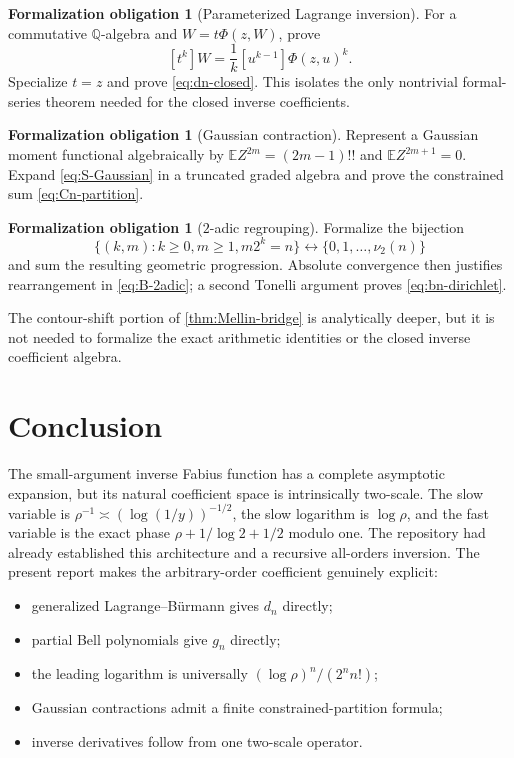 \documentclass[11pt,oneside]{article}
\numberwithin{equation}{section}
\theoremstyle{definition}
\newtheorem{obligation}[theorem]{Formalization obligation}
\theoremstyle{remark}
\newcommand{\Q}{\mathbb Q}
\newcommand{\E}{\mathbb E}
\newcommand{\vTwo}{\nu_2}
\begin{document}
\begin{obligation}[Parameterized Lagrange inversion]
For a commutative $\Q$-algebra and $W=t\Phi(z,W)$, prove
\[
 [t^k]W=\frac1k[u^{k-1}]\Phi(z,u)^k.
\]
Specialize $t=z$ and prove \eqref{eq:dn-closed}.  This isolates the only
nontrivial formal-series theorem needed for the closed inverse coefficients.
\end{obligation}

\begin{obligation}[Gaussian contraction]
Represent a Gaussian moment functional algebraically by
$\E Z^{2m}=(2m-1)!!$ and $\E Z^{2m+1}=0$.  Expand
\eqref{eq:S-Gaussian} in a truncated graded algebra and prove the constrained
sum \eqref{eq:Cn-partition}.
\end{obligation}

\begin{obligation}[$2$-adic regrouping]
Formalize the bijection
\[
 \{(k,m):k\ge0,m\ge1,m2^k=n\}
 \longleftrightarrow
 \{0,1,\ldots,\vTwo(n)\}
\]
and sum the resulting geometric progression.  Absolute convergence then
justifies rearrangement in \eqref{eq:B-2adic}; a second Tonelli argument proves
\eqref{eq:bn-dirichlet}.
\end{obligation}

The contour-shift portion of \cref{thm:Mellin-bridge} is analytically deeper,
but it is not needed to formalize the exact arithmetic identities or the
closed inverse coefficient algebra.

\section{Conclusion}
\label{sec:conclusion}

The small-argument inverse Fabius function has a complete asymptotic expansion,
but its natural coefficient space is intrinsically two-scale.  The slow
variable is $\rho^{-1}\asymp(\log(1/y))^{-1/2}$, the slow logarithm is
$\log\rho$, and the fast variable is the exact phase
$\rho+1/\log2+1/2$ modulo one.  The repository had already established this
architecture and a recursive all-orders inversion.  The present report makes
the arbitrary-order coefficient genuinely explicit:
\begin{itemize}
\item generalized Lagrange--Bürmann gives $d_n$ directly;
\item partial Bell polynomials give $g_n$ directly;
\item the leading logarithm is universally $(\log\rho)^n/(2^nn!)$;
\item Gaussian contractions admit a finite constrained-partition formula;
\item inverse derivatives follow from one two-scale operator.
\end{itemize}
\end{document}
